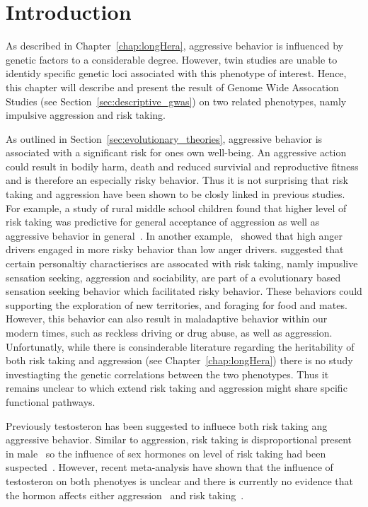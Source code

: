 \section{Introduction}
\label{sec:introduction}

As described in Chapter~\ref{chap:longHera}, aggressive behavior is influenced by genetic factors to a considerable degree.
However, twin studies are unable to identidy specific genetic loci associated with this phenotype of interest.
Hence, this chapter will describe and present the result of Genome Wide Assocation Studies (see Section~\ref{sec:descriptive_gwas}) on two related phenotypes, namly impulsive aggression and risk taking.

As outlined in Section~\ref{sec:evolutionary_theories}, aggressive behavior is associated with a significant risk for ones own well-being.
An aggressive action could result in bodily harm, death and reduced survivial and reproductive fitness and is therefore an especially risky behavior.
Thus it is not surprising that risk taking and aggression have been shown to be closly linked in previous studies.
For example, a study of rural middle school children found that higher level of risk taking was  predictive for general acceptance of aggression as well as aggressive behavior in general~\cite{Swaim2004}.
In another example,~\citet{Deffenbacher2003} showed that high anger drivers engaged in more risky behavior than low anger drivers.
\citet{Zuckerman2000} suggested that certain personaltiy charactieriscs are assocated with risk taking, namly impuslive sensation seeking, aggression and sociability, are part of a evolutionary based sensation seeking behavior which facilitated risky behavior.
These behaviors could supporting the exploration of new territories, and foraging for food and mates.
However, this behavior can also result in maladaptive behavior within our modern times, such as reckless driving or drug abuse, as well as aggression.
Unfortunatly, while there is consinderable literature regarding the heritability of both risk taking and aggression (see Chapter~\ref{chap:longHera}) there is no study investiagting the genetic correlations between the two phenotypes.
Thus it remains unclear to which extend risk taking and aggression might share spcific functional pathways.

Previously testosteron has been suggested to influece both risk taking ang aggressive behavior.
Similar to aggression, risk taking is disproportional present in male~\cite{Byrnes1999} so the influence of sex hormones on level of risk taking had been suspected~\cite{Vermeersch2008}.
However, recent meta-analysis have shown that  the influence of testosteron on both phenotyes is unclear and there is currently no evidence that the hormon affects either aggression~\cite{Archer2005a} and risk taking~\cite{Vermeersch2008}.


